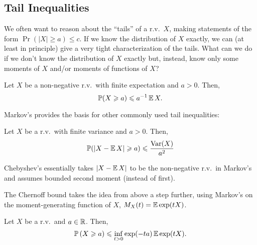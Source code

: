 \subsection{Tail Inequalities}

We often want to reason about the ``tails'' of a r.v.\ $X$, making statements 
of the form $\Pr(|X| \geq a) \leq c$. If we know the distribution of $X$ 
exactly, we can (at least in principle) give a very tight characterization of the 
tails. What can we do if we don't know the distribution of $X$ exactly but, instead,
know only some moments of $X$ and/or moments of functions of $X$?

\begin{theorem}
    Let $X$ be a non-negative r.v.\ with finite expectation and $a > 0$. Then,
    \[
        \operatorname*{\mathbb{P}}(X \geqslant a)
        \leqslant
        a^{-1} \operatorname*{\mathbb{E}} X.
    \]
\end{theorem}

Markov's provides the basis for other commonly used tail inequalities:

\begin{theorem}
    Let $X$ be a r.v.\ with finite variance and $a > 0$. Then,
    \[
        \operatorname*{\mathbb{P}}(|X - \operatorname*{\mathbb{E}} X| \geqslant a)
        \leqslant
        \frac{\text{Var}(X)}{a^2}
    \]
\end{theorem}

Chebyshev's essentially takes $|X-\operatorname*{\mathbb{E}} X|$ to be the non-negative r.v.\ 
in Markov's and assumes bounded second moment (instead of first).

The Chernoff bound takes the idea from above a step further, using Markov's on the moment-generating function 
of $X$, $M_X(t) = \operatorname*{\mathbb{E}} \exp(tX)$.

\begin{theorem}
    Let $X$ be a r.v.\ and $a \in \mathbb R$. Then,
    \[
        \operatorname*{\mathbb{P}} \left( X \geqslant a \right)
        \leqslant
        \inf_{t > 0} \exp(-ta) \operatorname*{\mathbb{E}} \exp(tX).
    \]
\end{theorem}

